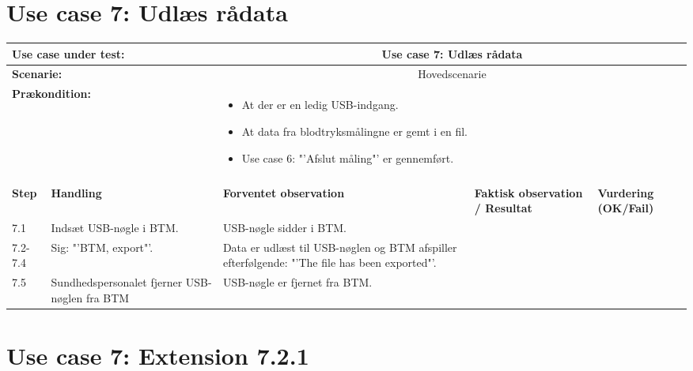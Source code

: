 \section{Use case 7: Udlæs rådata}
\begin{tabular}{|p{1cm}|p{3cm}|p{4cm}|p{4cm}|p{2cm}|}
\hline
\multicolumn{2}{|p{3cm}|}{\textbf{Use case under test:}} & \multicolumn{3}{c|}{Use case 7: Udlæs rådata} \\\hline

\multicolumn{2}{|p{3cm}|}{\textbf{Scenarie:}} & \multicolumn{3}{c|}{Hovedscenarie} \\\hline

\multicolumn{2}{|p{3cm}|}{\textbf{Prækondition:}}  & \multicolumn{3}{l|}{\parbox{0.6\textwidth}{
\begin{itemize}[label=$\circ$]
\item At der er en ledig USB-indgang.
\item At data fra blodtryksmålingne er gemt i en fil. 
\item Use case 6: "'Afslut måling"' er gennemført. 
\end{itemize} }}\\\hline

\multicolumn{5}{|c|}{} \\\hline

\textbf{Step} & \textbf{Handling} & \textbf{Forventet observation} & \textbf{Faktisk observation / Resultat} & \textbf{Vurdering (OK/Fail)}\\\hline

7.1 & Indsæt USB-nøgle i BTM. & USB-nøgle sidder i BTM. &  & \\\hline

7.2-7.4 & Sig: "'BTM, export"'. & Data er udlæst til USB-nøglen og BTM afspiller efterfølgende: "'The file has been exported"'. &  & \\\hline

7.5 & Sundhedspersonalet fjerner USB-nøglen fra BTM & USB-nøgle er fjernet fra BTM. &  & \\\hline

\end{tabular}


\section{Use case 7: Extension 7.2.1}

